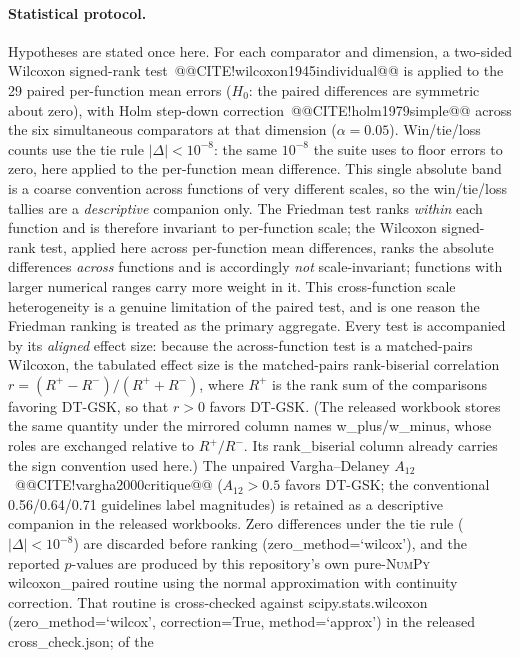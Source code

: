 \documentclass[10pt,a4paper]{article}
\newcommand{\dtgsk}{DT-GSK}
\begin{document}
\paragraph{Statistical protocol.}
Hypotheses are stated once here. For each comparator and dimension,
a two-sided Wilcoxon signed-rank test~@@CITE!wilcoxon1945individual@@
is applied to the 29 paired per-function mean errors
($H_{0}$: the paired differences are symmetric about zero), with
Holm step-down correction~@@CITE!holm1979simple@@ across the
six simultaneous comparators at that dimension ($\alpha = 0.05$).
Win/tie/loss counts use the tie rule $|\Delta| < 10^{-8}$: the same
$10^{-8}$ the suite uses to floor errors to zero, here applied to the
per-function mean difference. This single absolute band is a coarse
convention across functions of very different scales, so the win/tie/loss
tallies are a \emph{descriptive} companion only. The Friedman test ranks
\emph{within} each function and is therefore invariant to per-function scale;
the Wilcoxon signed-rank test, applied here across per-function mean
differences, ranks the absolute differences \emph{across} functions and is
accordingly \emph{not} scale-invariant; functions with larger numerical
ranges carry more weight in it. This cross-function scale heterogeneity is a
genuine limitation
of the paired test, and is one reason the Friedman ranking is treated as the
primary aggregate. Every
test is accompanied by its \emph{aligned} effect size: because the
across-function test is a matched-pairs Wilcoxon, the tabulated effect size is
the matched-pairs rank-biserial correlation
$r = (R^{+} - R^{-})/(R^{+} + R^{-})$, where $R^{+}$ is the rank sum of the
comparisons favoring \dtgsk{}, so that $r > 0$ favors \dtgsk{}. (The released
workbook stores the same quantity under the mirrored column names
w\_plus/w\_minus, whose roles are exchanged relative to
$R^{+}/R^{-}$. Its rank\_biserial column already carries the sign
convention used here.) The
unpaired Vargha--Delaney $A_{12}$~@@CITE!vargha2000critique@@ ($A_{12} > 0.5$
favors \dtgsk{}; the conventional 0.56/0.64/0.71 guidelines label magnitudes)
is retained as a descriptive companion in the released workbooks. Zero differences under the tie rule
($|\Delta| < 10^{-8}$) are discarded before ranking
(zero\_method=`wilcox'), and the reported $p$-values are produced by
this repository's own pure-\textsc{NumPy} wilcoxon\_paired routine
using the normal approximation with continuity correction. That routine is
cross-checked against scipy.stats.wilcoxon
(zero\_method=`wilcox', correction=True,
method=`approx') in the released cross\_check.json; of the
\end{document}
